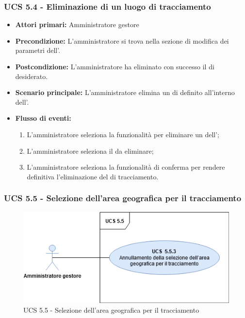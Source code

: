 \subsubsection{UCS 5.4 - Eliminazione di un luogo di tracciamento}%
\begin{itemize}
    \item \textbf{Attori primari:} Amministratore gestore
    \item \textbf{Precondizione:} L'amministratore si trova nella sezione di modifica dei parametri dell'.
    \item \textbf{Postcondizione:} L'amministratore ha eliminato con successo il  di  desiderato.
    \item \textbf{Scenario principale:} L'amministratore elimina un  di  definito all'interno dell'.
    \item \textbf{Flusso di eventi:}
    \begin{enumerate}%
        \item L'amministratore seleziona la funzionalità per eliminare un  dell';
        \item L'amministratore seleziona il  da eliminare;
        \item L'amministratore seleziona la funzionalità di conferma per rendere definitiva l'eliminazione del  di tracciamento.
    \end{enumerate}
\end{itemize}

\subsubsection{UCS 5.5 - Selezione dell'area geografica per il tracciamento}%

\begin{figure}[h]
	\centering
    \includegraphics[scale=0.50]{Sezioni/UseCase/Immagini/UCS5.5.png}
    \caption{UCS 5.5 - Selezione dell'area geografica per il tracciamento}
\end{figure}

